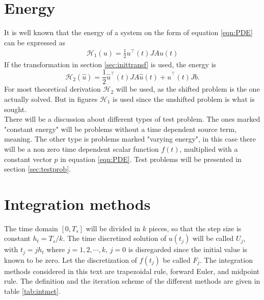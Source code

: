 \section{Energy}%
It is well known that the energy of a system on the form of equation \eqref{eqn:PDE} can be expressed as \cite{energy}
\begin{equation*}
\begin{aligned}
\mathcal{H}_1(u) = \frac{1}{2} u^\top (t) J A u(t)
\end{aligned}
\end{equation*}
If the transformation in section \ref{sec:inittransf} is used, the energy is 
\begin{equation}
\mathcal{H}_2 (\hat{u}) = \frac{1}{2} \hat{u}^\top (t)  J A \hat{u}(t) + \hat{u}^\top (t)  J b.
\label{eqn:energy2}
\end{equation}
For most theoretical derivation $\mathcal{H}_2$ will be used, as the shifted problem is the one actually solved. But in figures $\mathcal{H}_1$ is used since the unshifted problem is what is sought. \\

There will be a discussion about different types of test problem. The ones marked "constant energy" will be problems without a time dependent source term, meaning. The other type is problems marked "varying energy", in this case there will be a non zero time dependent scalar function $f(t)$, multiplied with a constant vector $p$ in equation \eqref{eqn:PDE}. Test problems will be presented in section \ref{sec:testprob}.

\section{Integration methods}%
The time domain $[0,T_s]$ will be divided in $k$ pieces, so that the step size is constant $h_t = T_s/k$. The time discretized solution of $u(t_j)$ will be called $U_j$, with $t_j = j h_t$ where $ j = 1,2,\cdots,k $, $j = 0$ is disregarded since the initial value is known to be zero. Let the discretization of $f(t_j)$ be called $F_j$. The integration methods considered in this text are trapezoidal rule, forward Euler, and midpoint rule. The definition and the iteration scheme of the different methods are given in table \ref{tab:intmet}. \\


